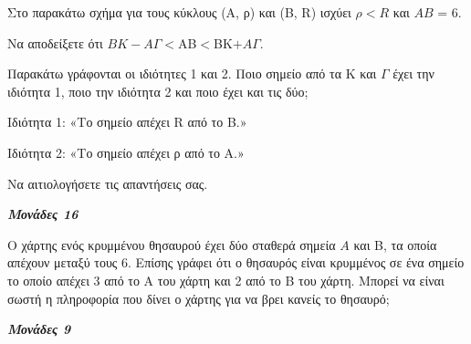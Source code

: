 \documentclass[11pt,a4paper,twoside]{book}
\newcommand{\monades}[1]{
\hspace*{\fill}
\textbf{\textit{\textcolor{maincolor}{Μονάδες #1}}}}
\begin{document}
\begin{alist}
\item Στο παρακάτω σχήμα για τους κύκλους (Α, ρ) και (Β, R) ισχύει $\rho < R$ και $AB$ = 6.


\begin{center}
\end{center}

\begin{rlist}
\item Να αποδείξετε ότι $ΒK - Α\varGamma  < $AB$ < $BK$ + Α\varGamma $.

\item Παρακάτω γράφονται οι ιδιότητες 1 και 2. Ποιο σημείο από τα Κ και $\varGamma$ έχει την ιδιότητα 1, ποιο την ιδιότητα 2 και ποιο έχει και τις δύο;

Ιδιότητα 1: «Το σημείο απέχει R από το Β.»

Ιδιότητα 2: «Το σημείο απέχει ρ από το Α.»

Να αιτιολογήσετε τις απαντήσεις σας.

\monades{16}

\end{rlist}
\item Ο χάρτης ενός κρυμμένου θησαυρού έχει δύο σταθερά σημεία $A$ και Β, τα οποία απέχουν μεταξύ τους 6. Επίσης γράφει ότι ο θησαυρός είναι κρυμμένος σε ένα σημείο το οποίο απέχει 3 από το Α του χάρτη και 2 από το Β του χάρτη. Μπορεί να είναι σωστή η πληροφορία που δίνει ο χάρτης για να βρει κανείς το θησαυρό;

\monades{9}
\end{alist}
\end{document}
